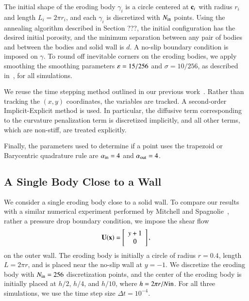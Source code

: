 \documentclass[preprint, 10pt]{elsarticle}
\begin{document}
The initial shape of the eroding body $\gamma_i$ is a circle centered at
${\mathbf{c}}_i$ with radius $r_i$ and length $L_i = 2\pi r_i$, and each
$\gamma_i$ is discretized with $N_{\mathrm{in}}$ points.  Using the annealing
algorithm described in Section ???, the initial configuration has the
desired initial porosity, and the minimum separation between any pair of
bodies and between the bodies and solid wall is $d$.  A no-slip boundary
condition is imposed on $\gamma$.  To round off inevitable corners on
the eroding bodies, we apply smoothing the smoothing parameters {\color{red}
$\varepsilon=15/256$ and $\sigma=10/256$,} as described in~\cite{qua-moo2018}, for all
simulations.  

We reuse the time stepping method outlined in our previous
work~\cite{qua-moo2018}.  Rather than tracking the $(x,y)$
coordinates, the {\thL} variables are tracked. A second-order
Implicit-Explicit method is used. In particular, the diffusive term
corresponding to the curvature penalization term is discretized
implicitly, and all other terms, which are non-stiff, are treated
explicitly.

Finally, the parameters used to determine if a point uses the trapezoid
or Barycentric quadrature rule are $\alpha_{\mathrm{in}} = 4$ and
$\alpha_{\mathrm{out}}=4$.

\subsection{A Single Body Close to a Wall}
We consider a single eroding body close to a solid wall.  To compare our
results with a similar numerical experiment performed by Mitchell and
Spagnolie~\cite{mit-spa2017}, rather a pressure drop boundary condition,
we impose the shear flow
\begin{align}
  {\mathbf{U}}({\mathbf{x}})=\left[
  \begin{array}{c}
    y+1 \\ 0
  \end{array}
  \right],
\end{align}
on the outer wall.  The eroding body is initially a circle of
radius $r=0.4$, length $L = 2\pi r$, and is placed near the no-slip wall
at $y=-1$.  We discretize the eroding body with $N_{\mathrm{in}}=256$
discretization points, and the center of the eroding body is initially
placed at $h/2$, $h/4$, and $h/10$, where $h = 2\pi r/N\mathrm{in}$.  For all
three simulations, we use the time step size $\Delta t=10^{-4}$.
\end{document}
